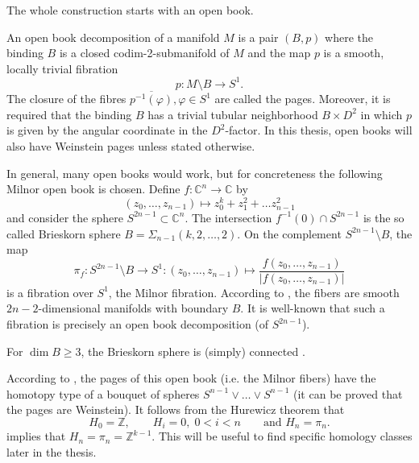 The whole construction starts with an open book.

\begin{definition}\label{def:open_book_1}
    An open book decomposition of a manifold $M$ is a pair $(B,p)$ where the binding $B$ is a closed codim-2-submanifold of $M$ and the map $p$ is a smooth, locally trivial fibration
    \[
        p: M\setminus B \to S^1.
    \]
    The closure of the fibres $\overline{p^{-1}(\varphi)}, \varphi \in S^1$ are called the pages.
    Moreover, it is required that the binding $B$ has a trivial tubular neighborhood $B\times D^2$ in which $p$ is given by the angular coordinate in the $D^2$-factor.
    In this thesis, open books will also have Weinstein pages unless stated otherwise.
\end{definition}

In general, many open books would work, but for concreteness the following Milnor open book is chosen.
Define $f\colon \mathbb C^n \to \mathbb C$ by
\[
    (z_0, \dots, z_{n-1}) \mapsto z_0^k + z_1^2 + \dots z_{n-1}^2
\]
and consider the sphere $S^{2n-1} \subset \mathbb C^n$.
The intersection $f^{-1}(0) \cap S^{2n-1}$ is the so called Brieskorn sphere $B = \Sigma_{n-1}(k,2,\dots,2)$.
On the complement $S^{2n-1} \setminus B$, the map
\[
    \pi_f\colon S^{2n-1}\setminus B \to S^1\colon (z_0, \dots, z_{n-1}) \mapsto \frac{f(z_0, \dots, z_{n-1})}{|f(z_0, \dots, z_{n-1})|}
\]
is a fibration over $S^1$, the Milnor fibration.
According to \cite[Lemma 6.1]{Milnor69}, the fibers are smooth $2n-2$-dimensional manifolds with boundary $B$.
It is well-known that such a fibration is precisely an open book decomposition (of $S^{2n-1}$).

For $\dim B \geq 3$, the Brieskorn sphere is (simply) connected \cite[Lemma 2]{Brieskorn66}.

According to \cite[Thm 6.5]{Milnor69}, the pages of this open book (i.e. the Milnor fibers) have the homotopy type of a bouquet of spheres 
$S^{n-1} \vee \dots \vee S^{n-1}$ (it can be proved that the pages are Weinstein).
It follows from the Hurewicz theorem that 
\[
    H_0 = \mathbb Z, \qquad H_i = 0, \; 0 < i < n \qquad \text{and } H_n = \pi_n.
\]
\cite[Theorem 9.1]{Milnor69} implies that $H_n = \pi_n = \mathbb Z^{k-1}$.
This will be useful to find specific homology classes later in the thesis.
